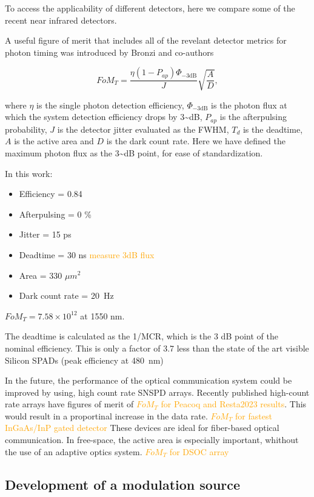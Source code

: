 \documentclass[11pt]{caltech_thesis} %
\begin{document}
To access the applicability of different detectors, here we compare some
of the recent near infrared detectors.

A useful figure of merit that includes all of the revelant detector
metrics for photon timing was introduced by Bronzi and co-authors
\autocite{Bronzi2016}

$$FoM_T = \frac{\eta  (1 - P_{ap})\Phi_{-3 \text{dB}}}{J} \sqrt{\frac{A}{D}},$$

where $\eta$ is the single photon detection efficiency,
$\Phi_{-3 \text{dB}}$ is the photon flux at which the system detection
efficiency drops by 3\textasciitilde dB, $P_{ap}$ is the afterpulsing
probability, $J$ is the detector jitter evaluated as the FWHM, $T_d$ is
the deadtime, $A$ is the active area and $D$ is the dark count rate.
Here we have defined the maximum photon flux as the 3\textasciitilde dB
point, for ease of standardization.

In this work:

\begin{itemize}
\tightlist
\item
  Efficiency = 0.84
\item
  Afterpulsing = 0 \%
\item
  Jitter = 15 ps
\item
  Deadtime = 30 ns \textcolor{orange}{measure 3dB flux}
\item
  Area = 330 $\mu m^2$
\item
  Dark count rate = 20~Hz
\end{itemize}

$FoM_T = 7.58 \times 10^{12}$ at 1550 nm.

The deadtime is calculated as the 1/MCR, which is the 3 dB point of the
nominal efficiency. This is only a factor of 3.7 less than the state of
the art visible Silicon SPADs (peak efficiency at 480~nm)
\autocite{Gramuglia2022}

In the future, the performance of the optical communication system could
be improved by using, high count rate SNSPD arrays. Recently published
high-count rate arrays have figures of merit of
\textcolor{orange}{$FoM_T$ for Peacoq and Resta2023 results}. This would
result in a proportinal increase in the data rate.
\textcolor{orange}{$FoM_T$ for fastest InGaAs/InP gated detector} These
devices are ideal for fiber-based optical communication. In free-space,
the active area is especially important, whithout the use of an adaptive
optics system. \textcolor{orange}{$FoM_T$ for DSOC array}

\hypertarget{development-of-a-modulation-source}{%
\subsection{Development of a modulation
source}\label{development-of-a-modulation-source}}
\end{document}
